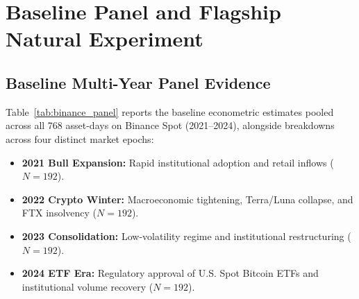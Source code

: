 \documentclass[12pt]{article}
\theoremstyle{definition}
\theoremstyle{remark}
\begin{document}
\section{Baseline Panel and Flagship Natural Experiment}
\label{sec:baseline_natural_exp}

\subsection{Baseline Multi-Year Panel Evidence}
Table~\ref{tab:binance_panel} reports the baseline econometric estimates pooled across all 768 asset-days on Binance Spot (2021--2024), alongside breakdowns across four distinct market epochs:
\begin{itemize}
    \item \textbf{2021 Bull Expansion:} Rapid institutional adoption and retail inflows ($N = 192$).
    \item \textbf{2022 Crypto Winter:} Macroeconomic tightening, Terra/Luna collapse, and FTX insolvency ($N = 192$).
    \item \textbf{2023 Consolidation:} Low-volatility regime and institutional restructuring ($N = 192$).
    \item \textbf{2024 ETF Era:} Regulatory approval of U.S. Spot Bitcoin ETFs and institutional volume recovery ($N = 192$).
\end{itemize}

\begin{table}[htbp]
\centering
\caption{\textbf{Baseline High-Frequency Feedback Panel (Binance Spot 2021--2024).}
Estimated feedback parameter $\hat{Q}$, 30-lag memory-purged feedback $\hat{Q}_{30}$, closed-loop persistence $\hat{S}$, loop ratio $\hat{\mathcal{L}}$, minimum-distance Lyapunov estimate $Q_{\text{MD}}$, and Rigobon heteroskedasticity estimate $Q_{\text{Rig}}$ across 8 liquid cryptocurrency pairs evaluated on 768 daily sessions ($66.3 \times 10^6$ one-second transitions). 95\% clustered confidence intervals in brackets.}
\label{tab:binance_panel}
\resizebox{\textwidth}{!}{%
%
}
\end{table}
\end{document}
